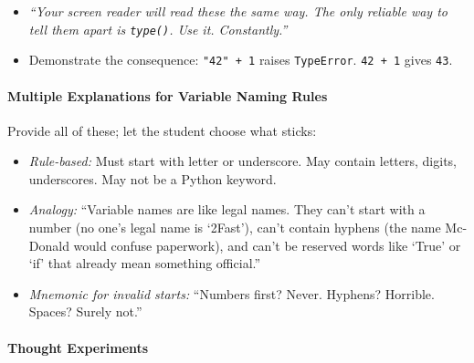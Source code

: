 \documentclass[
  justified,
  openright,
]{tufte-book}
\let\paragraph\paragraph
\let\paragraph\paragraph
\providecommand{\tightlist}{%
  \setlength{\itemsep}{0pt}\setlength{\parskip}{0pt}}
\begin{document}
\begin{itemize}
\tightlist
\item
  \emph{``Your screen reader will read these the same way. The only
  reliable way to tell them apart is \texttt{type()}. Use it.
  Constantly.''}
\item
  Demonstrate the consequence: \texttt{"42"\ +\ 1} raises
  \texttt{TypeError}. \texttt{42\ +\ 1} gives \texttt{43}.
\end{itemize}

\paragraph{Multiple Explanations for Variable Naming
Rules}\label{multiple-explanations-for-variable-naming-rules}

Provide all of these; let the student choose what sticks:

\begin{itemize}
\tightlist
\item
  \emph{Rule-based:} Must start with letter or underscore. May contain
  letters, digits, underscores. May not be a Python keyword.
\item
  \emph{Analogy:} ``Variable names are like legal names. They can't
  start with a number (no one's legal name is `2Fast'), can't contain
  hyphens (the name Mc-Donald would confuse paperwork), and can't be
  reserved words like `True' or `if' that already mean something
  official.''
\item
  \emph{Mnemonic for invalid starts:} ``Numbers first? Never. Hyphens?
  Horrible. Spaces? Surely not.''
\end{itemize}

\paragraph{Thought Experiments}\label{thought-experiments-6}
\end{document}
